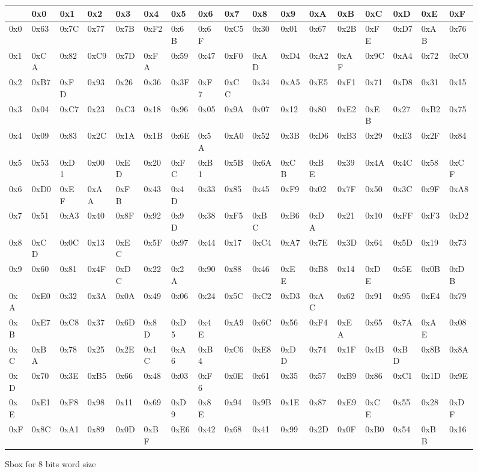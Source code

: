 \documentclass[a4paper,twoside]{llncs}
\begin{document}
\begin{figure}[b]{\tiny
\begin{center}
\begin{tabular}[]{|l||l|l|l|l|l|l|l|l|l|l|l|l|l|l|l|l|}\hline
    & 0x0  & 0x1  & 0x2  & 0x3  & 0x4  & 0x5  & 0x6  & 0x7  & 0x8  & 0x9  & 0xA  & 0xB  & 0xC  & 0xD  & 0xE  & 0xF \\\hline\hline
0x0 & 0x63 & 0x7C & 0x77 & 0x7B & 0xF2 & 0x6B & 0x6F & 0xC5 & 0x30 & 0x01 & 0x67 & 0x2B & 0xFE & 0xD7 & 0xAB & 0x76\\\hline
0x1 & 0xCA & 0x82 & 0xC9 & 0x7D & 0xFA & 0x59 & 0x47 & 0xF0 & 0xAD & 0xD4 & 0xA2 & 0xAF & 0x9C & 0xA4 & 0x72 & 0xC0 \\\hline
0x2 & 0xB7 & 0xFD & 0x93 & 0x26 & 0x36 & 0x3F & 0xF7 & 0xCC & 0x34 & 0xA5 & 0xE5 & 0xF1 & 0x71 & 0xD8 & 0x31 & 0x15 \\\hline
0x3 & 0x04 & 0xC7 & 0x23 & 0xC3 & 0x18 & 0x96 & 0x05 & 0x9A & 0x07 & 0x12 & 0x80 & 0xE2 & 0xEB & 0x27 & 0xB2 & 0x75 \\\hline
0x4 & 0x09 & 0x83 & 0x2C & 0x1A & 0x1B & 0x6E & 0x5A & 0xA0 & 0x52 & 0x3B & 0xD6 & 0xB3 & 0x29 & 0xE3 & 0x2F & 0x84 \\\hline
0x5 & 0x53 & 0xD1 & 0x00 & 0xED & 0x20 & 0xFC & 0xB1 & 0x5B & 0x6A & 0xCB & 0xBE & 0x39 & 0x4A & 0x4C & 0x58 & 0xCF \\\hline
0x6 & 0xD0 & 0xEF & 0xAA & 0xFB & 0x43 & 0x4D & 0x33 & 0x85 & 0x45 & 0xF9 & 0x02 & 0x7F & 0x50 & 0x3C & 0x9F & 0xA8 \\\hline
0x7 & 0x51 & 0xA3 & 0x40 & 0x8F & 0x92 & 0x9D & 0x38 & 0xF5 & 0xBC & 0xB6 & 0xDA & 0x21 & 0x10 & 0xFF & 0xF3 & 0xD2 \\\hline
0x8 & 0xCD & 0x0C & 0x13 & 0xEC & 0x5F & 0x97 & 0x44 & 0x17 & 0xC4 & 0xA7 & 0x7E & 0x3D & 0x64 & 0x5D & 0x19 & 0x73 \\\hline
0x9 & 0x60 & 0x81 & 0x4F & 0xDC & 0x22 & 0x2A & 0x90 & 0x88 & 0x46 & 0xEE & 0xB8 & 0x14 & 0xDE & 0x5E & 0x0B & 0xDB \\\hline
0xA & 0xE0 & 0x32 & 0x3A & 0x0A & 0x49 & 0x06 & 0x24 & 0x5C & 0xC2 & 0xD3 & 0xAC & 0x62 & 0x91 & 0x95 & 0xE4 & 0x79 \\\hline
0xB & 0xE7 & 0xC8 & 0x37 & 0x6D & 0x8D & 0xD5 & 0x4E & 0xA9 & 0x6C & 0x56 & 0xF4 & 0xEA & 0x65 & 0x7A & 0xAE & 0x08 \\\hline
0xC & 0xBA & 0x78 & 0x25 & 0x2E & 0x1C & 0xA6 & 0xB4 & 0xC6 & 0xE8 & 0xDD & 0x74 & 0x1F & 0x4B & 0xBD & 0x8B & 0x8A \\\hline
0xD & 0x70 & 0x3E & 0xB5 & 0x66 & 0x48 & 0x03 & 0xF6 & 0x0E & 0x61 & 0x35 & 0x57 & 0xB9 & 0x86 & 0xC1 & 0x1D & 0x9E \\\hline
0xE & 0xE1 & 0xF8 & 0x98 & 0x11 & 0x69 & 0xD9 & 0x8E & 0x94 & 0x9B & 0x1E & 0x87 & 0xE9 & 0xCE & 0x55 & 0x28 & 0xDF \\\hline
0xF & 0x8C & 0xA1 & 0x89 & 0x0D & 0xBF & 0xE6 & 0x42 & 0x68 & 0x41 & 0x99 & 0x2D & 0x0F & 0xB0 & 0x54 & 0xBB & 0x16 \\\hline
\end{tabular}
\end{center}}
\caption{Sbox for 8 bits word size}
\label{tab:sbox8}
\end{figure}
\end{document}

